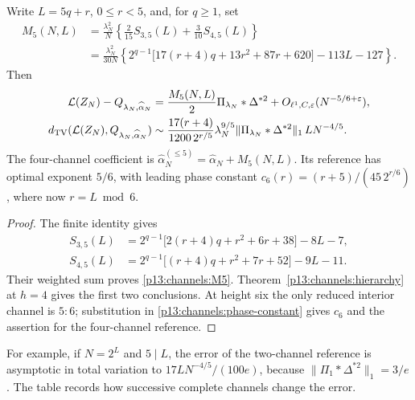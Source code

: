 \begin{corollary}
\label{p13:channels:height-five}
Write $L=5q+r$, $0\leq r<5$, and, for $q\geq1$, set
\begin{equation}
 \begin{split}
 M_5(N,L)&=\frac{\lambda_N^2}{N}
             \left\{\frac2{15}S_{3,5}(L)+\frac3{10}S_{4,5}(L)\right\}\\
 &=\frac{\lambda_N^2}{30N}
   \left\{2^{q-1}\bigl[17(r+4)q+13r^2+87r+620\bigr]
                              -113L-127\right\}.
 \end{split}
 \label{p13:channels:M5}
\end{equation}
Then
\begin{align}
 \mathcal L(Z_N)-Q_{\lambda_N,\widehat\alpha_N}
   &=\frac{M_5(N,L)}2\Pi_{\lambda_N}*\Delta^{*2}
                +O_{\ell^1,C,\varepsilon}(N^{-5/6+\varepsilon}),
                \label{p13:channels:two-channel-law}\\
 d_{\mathrm{TV}}(\mathcal L(Z_N),Q_{\lambda_N,\widehat\alpha_N})
   &\sim\frac{17(r+4)}{1200\,2^{r/5}}\lambda_N^{9/5}
       \|\Pi_{\lambda_N}*\Delta^{*2}\|_1\,L N^{-4/5}.
                \label{p13:channels:two-channel-tv}
\end{align}
The four-channel coefficient is
$\widehat\alpha_N^{(\leq5)}=\widehat\alpha_N+M_5(N,L)$.
Its reference has optimal exponent $5/6$, with leading phase constant
$c_6(r)=(r+5)/(45\,2^{r/6})$, where now $r=L\bmod6$.
\end{corollary}

\begin{proof}
The finite identity gives
\begin{align*}
 S_{3,5}(L)&=2^{q-1}\bigl[2(r+4)q+r^2+6r+38\bigr]-8L-7,\\
 S_{4,5}(L)&=2^{q-1}\bigl[(r+4)q+r^2+7r+52\bigr]-9L-11.
\end{align*}
Their weighted sum proves \eqref{p13:channels:M5}.
Theorem~\ref{p13:channels:hierarchy} at $h=4$ gives the first two
conclusions.  At height six the only reduced interior channel is $5:6$;
substitution in \eqref{p13:channels:phase-constant} gives $c_6$ and the
assertion for the four-channel reference.
\end{proof}

For example, if $N=2^L$ and $5\mid L$, the error of the two-channel
reference is asymptotic in total variation to
$17LN^{-4/5}/(100e)$, because
$\|\Pi_1*\Delta^{*2}\|_1=3/e$.
The table records how successive complete channels change the error.

